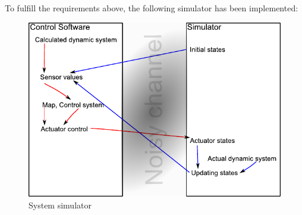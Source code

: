 To fulfill the requirements above, the following simulator has been implemented:

\begin{figure}[H]
	\centering
	\includegraphics[width=\textwidth]{img/simulator}
	\caption{System simulator}
	\label{fig:simulator}
\end{figure}